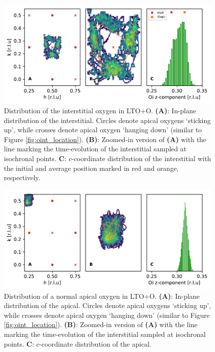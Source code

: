 \begin{figure}
	\centering
	\includegraphics[width=\textwidth]{fig/md/diffusion1.pdf}
	\caption[MD Oint Diffusion Oi]{Distribution of the interstitial oxygen in LTO+O. \textbf{(A)}: In-plane distribution of the interstitial. Circles denote apical oxygens `sticking up', while crosses denote apical oxygen `hanging down' (similar to Figure \ref{fig:oint_location}). \textbf{(B)}: Zoomed-in version of \textbf{(A)} with the line marking the time-evolution of the interstitial sampled at isochronal points. \textbf{C}: $c$-coordinate distribution of the interstitial with the initial and average position marked in red and orange, respectively.}
	\label{fig:md_diffusion1}
\end{figure}

\begin{figure}
	\centering
	\includegraphics[width=\textwidth]{fig/md/diffusion3.pdf}
	\caption[MD Oint Diffusion Oap 2]{Distribution of a normal apical oxygen in LTO+O. \textbf{(A)}: In-plane distribution of the apical. Circles denote apical oxygens `sticking up', while crosses denote apical oxygen `hanging down' (similar to Figure \ref{fig:oint_location}). \textbf{(B)}: Zoomed-in version of \textbf{(A)} with the line marking the time-evolution of the interstitial sampled at isochronal points. \textbf{C}: $c$-coordinate distribution of the apical.}
	\label{fig:md_diffusion3}
\end{figure}

